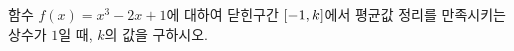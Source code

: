함수 $f(x)=x^3-2x+1$에 대하여 닫힌구간 $[-1{,}\mkern3mu\mathopen{}k]$에서 평균값 정리를 만족시키는 상수가 $1$일 때, $k$의 값을 구하시오. 
